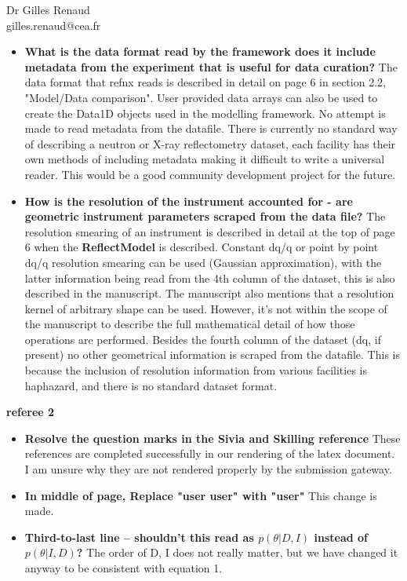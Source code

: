 \documentclass[fontsize=12pt, paper=a4]{scrlttr2}
\begin{document}
\begin{letter}{Dr Gilles Renaud \\ gilles.renaud@cea.fr}
\begin{itemize}
\item \textbf{What is the data format read by the framework does it include metadata from the experiment that is useful for data curation?} The data format that refnx reads is described in detail on page 6 in section 2.2, "Model/Data comparison". User provided data arrays can also be used to create the Data1D objects used in the modelling framework. No attempt is made to read metadata from the datafile. There is currently no standard way of describing a neutron or X-ray reflectometry dataset, each facility has their own methods of including metadata making it difficult to write a universal reader. This would be a good community development project for the future.
\item \textbf{How is the resolution of the instrument accounted for - are geometric instrument parameters scraped from the data file?} The resolution smearing of an instrument is described in detail at the top of page 6 when the \textbf{ReflectModel} is described. Constant dq/q or point by point dq/q resolution smearing can be used (Gaussian approximation), with the latter information being read from the 4th column of the dataset, this is also described in the manuscript. The manuscript also mentions that a resolution kernel of arbitrary shape can be used. However, it's not within the scope of the manuscript to describe the full mathematical detail of how those operations are performed. Besides the fourth column of the dataset (dq, if present) no other geometrical information is scraped from the datafile. This is because the inclusion of resolution information from various facilities is haphazard, and there is no standard dataset format.

\end{itemize}


\textbf{referee 2}
\begin{itemize}
\item \textbf{Resolve the question marks in the Sivia and Skilling reference} These references are completed successfully in our rendering of the latex document. I am unsure why they are not rendered properly by the submission gateway.
\item \textbf{In middle of page, Replace "user user" with "user"} This change is made.
\item \textbf{Third-to-last line – shouldn't this read as $p(\theta|D,I)$ instead of $p(\theta|I,D)$?} The order of D, I does not really matter, but we have changed it anyway to be consistent with equation 1.
\end{itemize}



\end{letter}
\end{document}
